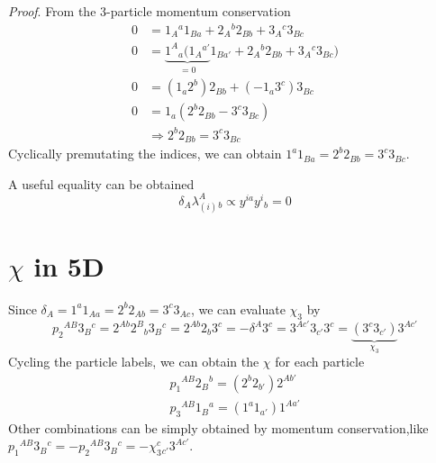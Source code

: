 \documentclass[12pt]{article}
\begin{document}
\textit{Proof}. From the 3-particle momentum conservation
\begin{align}
    0&=1_A{}^a1_{Ba}+2_A{}^b2_{Bb}+3_A{}^c3_{Bc}\\
    0&=\underbrace{1^A{}_a(1_A{}^{a'}}_{=0}1_{B{a'}}+2_A{}^b2_{Bb}+3_A{}^c3_{Bc})\\
    0&=(1_a2^b)2_{Bb}+(-1_a3^c)3_{Bc}\\
    0&=1_a(2^b2_{Bb}-3^c3_{Bc})\\
    &\Rightarrow 2^b2_{Bb}=3^c3_{Bc}
\end{align}
Cyclically premutating the indices, we can obtain $1^a1_{Ba}=2^b2_{Bb}=3^c3_{Bc}$.

A useful equality can be obtained 
\begin{equation}
    \delta_A\lambda_(i)^A{}_b\propto y^{ia}y^i{}_b=0
\end{equation}
\section{$\chi$ in 5D}
Since $\delta_A=1^a1_{Aa}=2^b2_{Ab}=3^c3_{Ac}$, we can evaluate $\chi_3$ by
\begin{equation}
    p_2{}^{AB}3_B{}^c=2^{Ab}2^B{}_b3_B{}^c=2^{Ab}2_b3^c=-\delta^A3^c=3^{A{c'}}3_{c'}3^c=\underbrace{(3^c3_{c'})}_{\chi_3} 3^{A{c'}}
\end{equation}
Cycling the particle labels, we can obtain the $\chi$ for each particle
\begin{gather}
    p_1{}^{AB}2_B{}^b=(2^b2_{b'})2^{A{b'}}\\
    p_3{}^{AB}1_B{}^a=(1^a1_{a'})1^{A{a'}}
\end{gather}
Other combinations can be simply obtained by momentum conservation,like $ p_1{}^{AB}3_B{}^c=-p_2{}^{AB}3_B{}^c=-\chi_3^c{}_{c'}3^{A{c'}}$.
\end{document}
